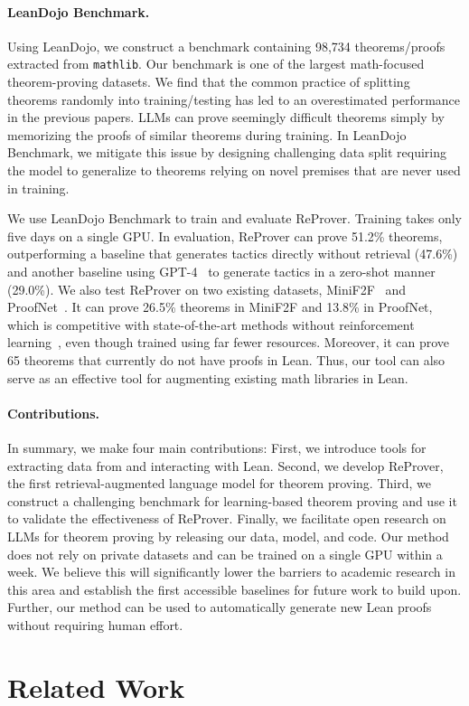 \documentclass{article}
\newcommand{\smallsec}[1]{\vspace{-1mm} \paragraph{#1.}}
\newcommand\name{ReProver}
\newcommand\numproofs{98,734}
\begin{document}
\smallsec{LeanDojo Benchmark} Using LeanDojo, we construct a benchmark containing {\numproofs} theorems/proofs extracted from \texttt{mathlib}. Our benchmark is one of the largest math-focused theorem-proving datasets. We find that the common practice of splitting theorems randomly into training/testing has led to an overestimated performance in the previous papers. LLMs can prove seemingly difficult theorems simply by memorizing the proofs of similar theorems during training. In LeanDojo Benchmark, we mitigate this issue by designing challenging data split requiring the model to generalize to theorems relying on novel premises that are never used in training.

We use LeanDojo Benchmark to train and evaluate {\name}. Training takes only five days on a single GPU. In evaluation, {\name} can prove 51.2\% theorems, outperforming a baseline that generates tactics directly without retrieval (47.6\%) and another baseline using GPT-4~\cite{openai2023gpt4} to generate tactics in a zero-shot manner (29.0\%). We also test {\name} on two existing datasets, MiniF2F~\cite{zheng2022minif2f} and ProofNet~\cite{azerbayev2023proofnet}. It can prove 26.5\% theorems in MiniF2F and 13.8\% in ProofNet, which is competitive with state-of-the-art methods without reinforcement learning~\cite{polu2023formal}, even though trained using far fewer resources. Moreover, it can prove 65 theorems that currently do not have proofs in Lean. Thus, our tool can also serve as an effective tool for augmenting existing math libraries in Lean.


\smallsec{Contributions}
In summary, we make four main contributions: First, we introduce tools for extracting data from and interacting with Lean. Second, we develop {\name}, the first retrieval-augmented language model for theorem proving. Third, we construct a challenging benchmark for learning-based theorem proving and use it to validate the effectiveness of {\name}. Finally, we facilitate open research on LLMs for theorem proving by releasing our data, model, and code. Our method does not rely on private datasets and can be trained on a single GPU within a week. We believe this will significantly lower the barriers to academic research in this area and establish the first accessible baselines for future work to build upon. Further, our method can be used to automatically generate new Lean proofs without requiring human effort.


\section{Related Work}
\end{document}
